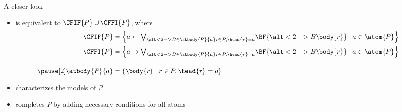 \begin{frame}{A closer look}
  \bigskip
  \begin{itemize}
  \item {} is equivalent to $\CFIF{P}\cup\CFFI{P}$,
    where
    \begin{align*}
      \CFIF{P}
      & =
        \left\{a \leftarrow \textstyle{\bigvee_{\alt<2->{B\in\atbody{P}{a}}{r\in P, \head{r} = a}}}    \BF{\alt<2->{B}{\body{r}}}        \mid a\in\atom{P}\right\}
      \\
      \CFFI{P}
      & =
        \left\{a \rightarrow \textstyle{\bigvee_{\alt<2->{B\in\atbody{P}{a}}{r\in P, \head{r} = a}}}    \BF{\alt<2->{B}{\body{r}}}        \mid a\in\atom{P}\right\}
      \\[10pt]\pause[2]
      \atbody{P}{a}
      & =
        \left\{\body{r} \mid r\in P, \head{r}=a\right\}
    \end{align*}
    \smallskip
  \item<only@3->  characterizes the models of $P$
    \smallskip
  \item<only@3->  completes $P$ by adding necessary conditions for all atoms
  \end{itemize}
\end{frame}
